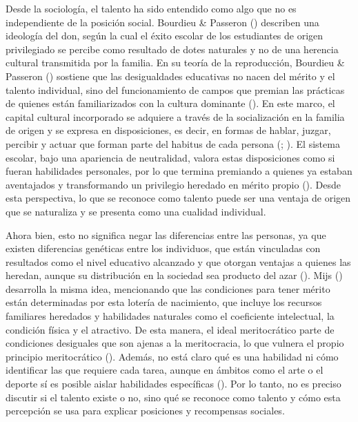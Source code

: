 \documentclass[
  spanish,
  a4paper,
  oneside]{scrbook}
\begin{document}
Desde la sociología, el talento ha sido entendido como algo que no es
independiente de la posición social. Bourdieu \& Passeron
() describen una ideología
del don, según la cual el éxito escolar de los estudiantes de origen
privilegiado se percibe como resultado de dotes naturales y no de una
herencia cultural transmitida por la familia. En su teoría de la
reproducción, Bourdieu \& Passeron
() sostiene que las
desigualdades educativas no nacen del mérito y el talento individual,
sino del funcionamiento de campos que premian las prácticas de quienes
están familiarizados con la cultura dominante
(). En este
marco, el capital cultural incorporado se adquiere a través de la
socialización en la familia de origen y se expresa en disposiciones, es
decir, en formas de hablar, juzgar, percibir y actuar que forman parte
del habitus de cada persona
(;
). El sistema
escolar, bajo una apariencia de neutralidad, valora estas disposiciones
como si fueran habilidades personales, por lo que termina premiando a
quienes ya estaban aventajados y transformando un privilegio heredado en
mérito propio ().
Desde esta perspectiva, lo que se reconoce como talento puede ser una
ventaja de origen que se naturaliza y se presenta como una cualidad
individual.

Ahora bien, esto no significa negar las diferencias entre las personas,
ya que existen diferencias genéticas entre los individuos, que están
vinculadas con resultados como el nivel educativo alcanzado y que
otorgan ventajas a quienes las heredan, aunque su distribución en la
sociedad sea producto del azar (). Mijs ()
desarrolla la misma idea, mencionando que las condiciones para tener
mérito están determinadas por esta lotería de nacimiento, que incluye
los recursos familiares heredados y habilidades naturales como el
coeficiente intelectual, la condición física y el atractivo. De esta
manera, el ideal meritocrático parte de condiciones desiguales que son
ajenas a la meritocracia, lo que vulnera el propio principio
meritocrático ().
Además, no está claro qué es una habilidad ni cómo identificar las que
requiere cada tarea, aunque en ámbitos como el arte o el deporte sí es
posible aislar habilidades específicas
(). Por lo
tanto, no es preciso discutir si el talento existe o no, sino qué se
reconoce como talento y cómo esta percepción se usa para explicar
posiciones y recompensas sociales.
\end{document}
